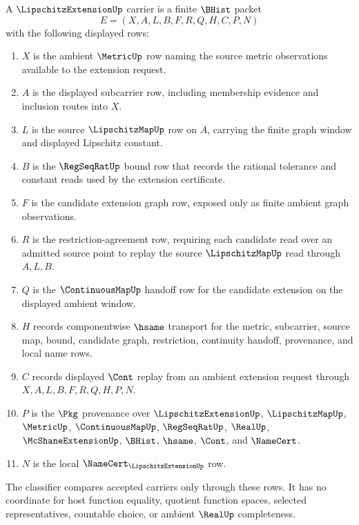 \begin{definition}
\label{def:lipschitz-extension-carrier}
A $\LipschitzExtensionUp$ carrier is a finite $\BHist$ packet
$$
E=(X,A,L,B,F,R,Q,H,C,P,N)
$$
with the following displayed rows:
\begin{enumerate}
\item $X$ is the ambient $\MetricUp$ row naming the source metric observations available to the extension request.
\item $A$ is the displayed subcarrier row, including membership evidence and inclusion routes into $X$.
\item $L$ is the source $\LipschitzMapUp$ row on $A$, carrying the finite graph window and displayed Lipschitz constant.
\item $B$ is the $\RegSeqRatUp$ bound row that records the rational tolerance and constant reads used by the extension certificate.
\item $F$ is the candidate extension graph row, exposed only as finite ambient graph observations.
\item $R$ is the restriction-agreement row, requiring each candidate read over an admitted source point to replay the source $\LipschitzMapUp$ read through $A,L,B$.
\item $Q$ is the $\ContinuousMapUp$ handoff row for the candidate extension on the displayed ambient window.
\item $H$ records componentwise $\hsame$ transport for the metric, subcarrier, source map, bound, candidate graph, restriction, continuity handoff, provenance, and local name rows.
\item $C$ records displayed $\Cont$ replay from an ambient extension request through $X,A,L,B,F,R,Q,H,P,N$.
\item $P$ is the $\Pkg$ provenance over $\LipschitzExtensionUp$, $\LipschitzMapUp$, $\MetricUp$, $\ContinuousMapUp$, $\RegSeqRatUp$, $\RealUp$, $\McShaneExtensionUp$, $\BHist$, $\hsame$, $\Cont$, and $\NameCert$.
\item $N$ is the local $\NameCert_{\LipschitzExtensionUp}$ row.
\end{enumerate}
The classifier compares accepted carriers only through these rows. It has no coordinate for host function equality, quotient function spaces, selected representatives, countable choice, or ambient $\RealUp$ completeness.
\end{definition}

